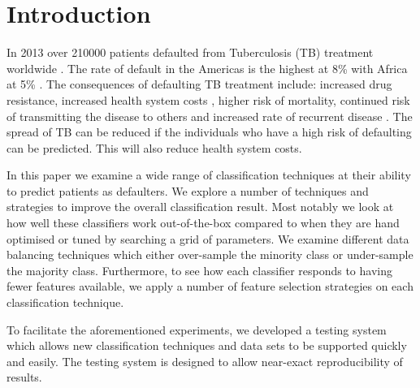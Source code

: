\documentclass{sig-alternate-05-2015}
\begin{document}
	\maketitle
	\begin{abstract}
	\end{abstract}
	
	\printccsdesc
	
	
	
	\section{Introduction}
	In 2013 over 210\hspace*{1mm}000 patients defaulted from Tuberculosis (TB) treatment worldwide \cite{world2015TB}. The rate of default in the Americas is the highest at 8\% with Africa at 5\% \cite{world2015TB}. The consequences of defaulting TB treatment include: increased drug resistance, increased health system costs \cite{Lackey:10356751520150601, muture:6660173120110101}, higher risk of mortality, continued risk of transmitting the disease to others \cite{Lackey:10356751520150601} and increased rate of recurrent disease \cite{Jha:10.1371/journal.pone.0008873}. The spread of TB can be reduced if the individuals who have a high risk of defaulting can be predicted. This will also reduce health system costs.
	
	In this paper we examine a wide range of classification techniques at their ability to predict patients as defaulters. We explore a number of techniques and strategies to improve the overall classification result. Most notably we look at how well these classifiers work out-of-the-box compared to when they are hand optimised or tuned by searching a grid of parameters. We examine different data balancing techniques which either over-sample the minority class or under-sample the majority class. Furthermore, to see how each classifier responds to having fewer features available, we apply a number of feature selection strategies on each classification technique.
	
	To facilitate the aforementioned experiments, we developed a testing system which allows new classification techniques and data sets to be supported quickly and easily. The testing system is designed to allow near-exact reproducibility of results.
	
\end{document}
